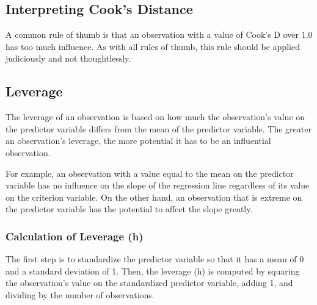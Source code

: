 \documentclass[12pt, a4paper]{article}
\theoremstyle{plain}
\theoremstyle{definition}
\theoremstyle{remark}
\begin{document}
\subsection{Interpreting Cook's Distance}
A common rule of thumb is that an observation with a value of Cook's D over 1.0 has too much influence. As with all rules of thumb, this rule should be applied judiciously and not thoughtlessly.

\subsection{Leverage}
The leverage of an observation is based on how much the observation's value on the predictor variable differs from the mean of the predictor variable. The greater an observation's leverage, the more potential it has to be an influential observation. 

For example, an observation with a value equal to the mean on the predictor variable has no influence on the slope of the regression line regardless of its value on the criterion variable. On the other hand, an observation that is extreme on the predictor variable has the potential to affect the slope greatly.

\subsubsection{Calculation of Leverage (h)}
The first step is to standardize the predictor variable so that it has a mean of 0 and a standard deviation of 1. Then, the leverage (h) is computed by squaring the observation's value on the standardized predictor variable, adding 1, and dividing by the number of observations.
\end{document}
